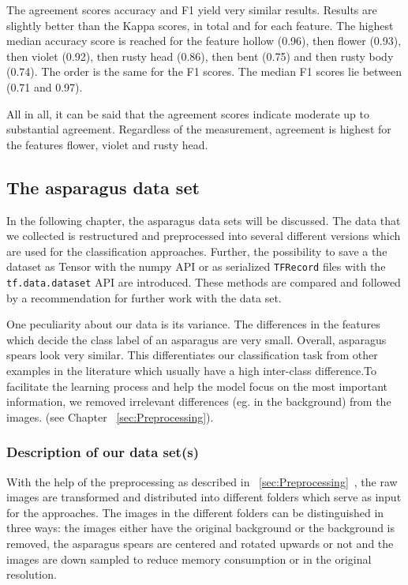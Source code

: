 The agreement scores accuracy and F1 yield very similar results. Results are slightly better than the Kappa scores, in total and for each feature. The highest median accuracy score is reached for the feature hollow (0.96), then flower (0.93), then violet (0.92), then rusty head (0.86), then bent (0.75) and then rusty body (0.74). The order is the same for the F1 scores. The median F1 scores lie between (0.71 and 0.97).

\bigskip
All in all, it can be said that the agreement scores indicate moderate up to substantial agreement. Regardless of the measurement, agreement is highest for the features flower, violet and rusty head.


\subsection{The asparagus data set}
\label{sec:AsparagusDataSet}

In the following chapter, the asparagus data sets will be discussed. The data that we collected is restructured and preprocessed into several different versions which are used for the classification approaches. Further, the possibility to save a the dataset as Tensor with the numpy API or as serialized \texttt{TFRecord} files with the \mbox{\texttt{tf.data.dataset}} API are introduced. These methods are compared and followed by a recommendation for further work with the data set.

One peculiarity about our data is its variance. The differences in the features which decide the class label of an asparagus are very small. Overall, asparagus spears look very similar. This differentiates our classification task from other examples in the literature which usually have a high inter-class difference.To facilitate the learning process and help the model focus on the most important information, we removed irrelevant differences (eg. in the background) from the images. (see Chapter ~\ref{sec:Preprocessing}).

\subsubsection{Description of our data set(s)}
\label{subsec:DifferentDataSets}


With the help of the preprocessing as described in ~\ref{sec:Preprocessing}~, the raw images are transformed and distributed into different folders which serve as input for the approaches.
The images in the different folders can be distinguished in three ways: the images either have the original background or the background is removed, the asparagus spears are centered and rotated upwards or not and the images are down sampled to reduce memory consumption or in the original resolution.

